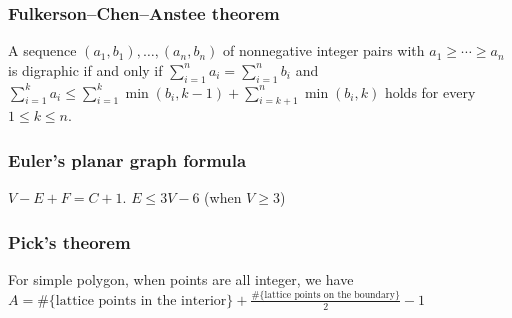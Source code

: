 \subsubsection{Fulkerson–Chen–Anstee theorem}
A sequence $(a_1,b_1),\ldots,(a_n,b_n)$ of nonnegative integer pairs with $a_1\ge\cdots\ge a_n$ is digraphic if and only if $\sum_{i=1}^n a_i=\sum_{i=1}^n b_i$ and $\sum_{i=1}^k a_i\le \sum_{i=1}^k\min(b_i,k-1)+\sum_{i=k+1}^n\min(b_i,k)$ holds for every $1\le k\le n$.


\subsubsection{Euler's planar graph formula}
$V-E+F=C+1$. $E\leq 3V-6$ (when $V\geq 3$)

\subsubsection{Pick's theorem}
For simple polygon, when points are all integer, we have $A=\text{\#\{lattice points in the interior\}} + \frac{\text{\#\{lattice points on the boundary\}}}{2} - 1$


